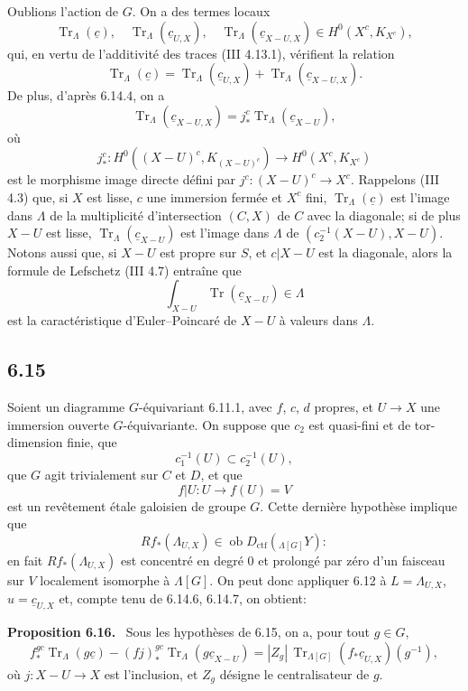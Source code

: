 \documentclass[11pt]{article}
\newenvironment{statement}[1]{\par\medskip\noindent\textbf{#1.}\ }{\par\medskip}
\providecommand{\Tr}{\operatorname{Tr}}
\providecommand{\Tr}{\operatorname{Tr}}
\providecommand{\Ob}{\operatorname{ob}}
\providecommand{\Tr}{\operatorname{Tr}}
\providecommand{\Ob}{\operatorname{ob}}
\providecommand{\Tr}{\operatorname{Tr}}
\providecommand{\Ob}{\operatorname{Ob}}
\begin{document}
Oublions l'action de $G$. On a des termes locaux
\begin{equation}
\Tr_{\Lambda}(\underline c),\quad
\Tr_{\Lambda}(\underline c_{U,X}),\quad
\Tr_{\Lambda}(\underline c_{X-U,X})
\in H^0(X^c,K_{X^c}),
\tag{6.14.5}
\end{equation}
qui, en vertu de l'additivité des traces (III 4.13.1), vérifient la relation
\begin{equation}
\Tr_{\Lambda}(\underline c)
=
\Tr_{\Lambda}(\underline c_{U,X})
+
\Tr_{\Lambda}(\underline c_{X-U,X}).
\tag{6.14.6}
\end{equation}
De plus, d'après 6.14.4, on a
\begin{equation}
\Tr_{\Lambda}(\underline c_{X-U,X})
=
j_*^c\Tr_{\Lambda}(\underline c_{X-U}),
\tag{6.14.7}
\end{equation}
où
\[
j_*^c:H^0((X-U)^c,K_{(X-U)^c})\longrightarrow H^0(X^c,K_{X^c})
\]
est le morphisme image directe défini par $j^c:(X-U)^c\to X^c$. Rappelons (III 4.3) que, si $X$ est lisse, $c$ une immersion fermée et $X^c$ fini, $\Tr_{\Lambda}(\underline c)$ est l'image dans $\Lambda$ de la multiplicité d'intersection $(C,X)$ de $C$ avec la diagonale; si de plus $X-U$ est lisse, $\Tr_{\Lambda}(\underline c_{X-U})$ est l'image dans $\Lambda$ de $(c_2^{-1}(X-U),X-U)$. Notons aussi que, si $X-U$ est propre sur $S$, et $c|X-U$ est la diagonale, alors la formule de Lefschetz (III 4.7) entraîne que
\[
\int_{X-U}\Tr(\underline c_{X-U})\in\Lambda
\]
est la caractéristique d'Euler--Poincaré de $X-U$ à valeurs dans $\Lambda$.

\subsection*{6.15}
Soient un diagramme $G$-équivariant 6.11.1, avec $f$, $c$, $d$ propres, et $U\to X$ une immersion ouverte $G$-équivariante. On suppose que $c_2$ est quasi-fini et de tor-dimension finie, que
\[
c_1^{-1}(U)\subset c_2^{-1}(U),
\]
que $G$ agit trivialement sur $C$ et $D$, et que
\[
f|U:U\longrightarrow f(U)=V
\]
est un revêtement étale galoisien de groupe $G$. Cette dernière hypothèse implique que
\[
Rf_*(\Lambda_{U,X})\in\Ob D_{\mathrm{ctf}}({}_{\Lambda[G]}Y):
\]
en fait $Rf_*(\Lambda_{U,X})$ est concentré en degré $0$ et prolongé par zéro d'un faisceau sur $V$ localement isomorphe à $\Lambda[G]$. On peut donc appliquer 6.12 à $L=\Lambda_{U,X}$, $u=\underline c_{U,X}$ et, compte tenu de 6.14.6, 6.14.7, on obtient:

\begin{statement}{Proposition 6.16}
Sous les hypothèses de 6.15, on a, pour tout $g\in G$,
\begin{equation}
f_*^{gc}\Tr_{\Lambda}(g\underline c)
-(fj)_*^{gc}\Tr_{\Lambda}(g\underline c_{X-U})
=
|Z_g|\,\Tr_{\Lambda[G]}(f_*\underline c_{U,X})(g^{-1}),
\tag{6.16.1}
\end{equation}
où $j:X-U\to X$ est l'inclusion, et $Z_g$ désigne le centralisateur de $g$.
\end{statement}
\end{document}
